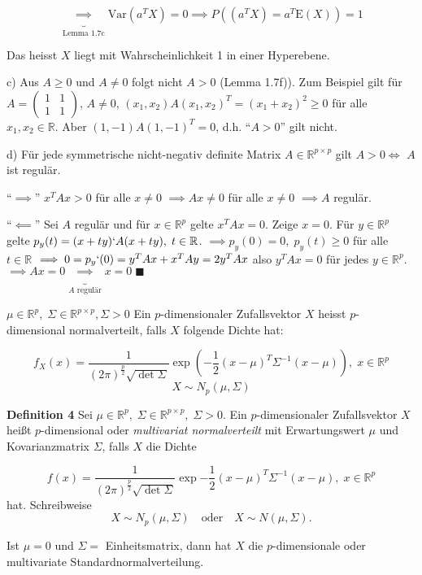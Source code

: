 \documentclass[12pt, a4paper]{article}
\newcommand{\E}{\mbox{I\negthinspace E}}
\theoremstyle{plain}
\theoremstyle{definition}
\newcommand{\R}{\mathbb{R}}
\newcommand{\1}{\mathds{1}}
\renewcommand{\E}{\mathrm{E}}
\newcommand{\Var}{\mathrm{Var}}
\providecommand{\mtext}[1]{\quad \text{#1} \quad}
\begin{document}
\[ \underbrace{\implies}_{\text{Lemma 1.7c}} \Var(a^T X) = 0 \implies P((a^T X) = a^T \E(X)) = 1   \]

Das heisst $X$ liegt mit Wahrscheinlichkeit 1 in einer Hyperebene.

c) Aus $A \geq 0$ und $A \neq 0$ folgt nicht $A > 0$ (Lemma 1.7f)). Zum Beispiel gilt für $A = \begin{pmatrix} 1 & 1 \\ 1 & 1 \end{pmatrix}$, $A\neq 0$, $(x_1, x_2) A (x_1, x_2)^T = (x_1 + x_2)^2 \geq 0$ für alle $x_1, x_2 \in \R$. Aber $(1, -1) A (1, -1)^T = 0$, d.h. ``$A>0$'' gilt nicht.

d) Für jede symmetrische nicht-negativ definite Matrix $A \in \R^{p \times p}$ gilt $ A > 0 \iff$ $A$ ist regulär. 

``$\implies$'' $ x^T A x > 0$ für alle $x \neq 0$ $\implies Ax \neq 0$ für alle $x \neq 0$ $\implies A$ regulär. 

``$\impliedby$'' Sei $A$ regulär und für $x \in \R^p$ gelte $x^T A x = 0$. Zeige $x=0$. Für $y \in \R^p$ gelte $p_y (t) = (x+ty)` A (x+ty), \; t \in \R$. $\implies p_y(0)=0, \; p_y(t) \geq 0$ für alle $t \in \R$ $\implies 0 = p_y ` (0) = y^T A x + x^T A y = 2y^T A x$ also $y^T A x = 0$ für jedes $y \in \R^p$. $\implies Ax = 0 \underbrace{\implies}_{\text{$A$ regulär}} x = 0 \; \blacksquare$

$\mu \in \R^p, \; \Sigma \in \R^{p \times p}, \Sigma > 0$ 
Ein $p$-dimensionaler Zufallsvektor $X$ heisst $p$-dimensional normalverteilt, falls $X$ folgende Dichte hat:

\[ f_X (x) = \frac{1}{(2\pi)^\frac{p}{2} \sqrt{\det \Sigma}} \exp \left( -  \frac{1}{2}(x-\mu)^T \Sigma^{-1} (x-\mu)   \right), \; x \in \R^p  \]
\[ X \sim N_p (\mu, \Sigma)   \]


\textbf{Definition 4} Sei  $\mu \in \R^p, \; \Sigma \in \R^{p \times p}, \; \Sigma > 0$. Ein $p$-dimensionaler Zufallsvektor  $X$ heißt $p$-dimensional oder \emph{multivariat normalverteilt} mit Erwartungswert $\mu$ und Kovarianzmatrix $\Sigma$, falls $X$ die Dichte

\[  f(x) = \frac{1}{(2\pi)^{\frac{p}{2}} \sqrt{\det \Sigma}} \exp{ - \frac{1}{2} (x-\mu)^T \Sigma^{-1} (x - \mu) }, \; x \in \R^p    \]  
hat. Schreibweise \[X \sim N_p (\mu, \Sigma) \mtext{oder} X \sim N(\mu, \Sigma).    \]

Ist $\mu = 0$ und $\Sigma = $ Einheitsmatrix, dann hat $X$ die $p$-dimensionale oder multivariate Standardnormalverteilung.
\end{document}
